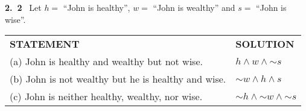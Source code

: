 \documentclass[a4paper,12pt]{article}
\newcommand*{\ltnot}{\mathord{\sim}}
\begin{document}
\textbf{2.~2} ~Let $h =$ ``John is healthy'', $w =$ ``John is wealthy'' and $s =$ ``John is wise''.
\begin{center}
    {
        \begin{tabular}{m{20em}|l}
            \textbf{STATEMENT}                                  & \textbf{SOLUTION}                          \\
            (a) John is healthy and wealthy but not wise.       & $h \land w \land \ltnot s $                \\
            (b) John is not wealthy but he is healthy and wise. & $ \ltnot w \land h \land s $               \\
            (c) John is neither healthy, wealthy, nor wise.     & $ \ltnot h \land \ltnot w \land \ltnot s $
        \end{tabular}}
\end{center}
\end{document}
